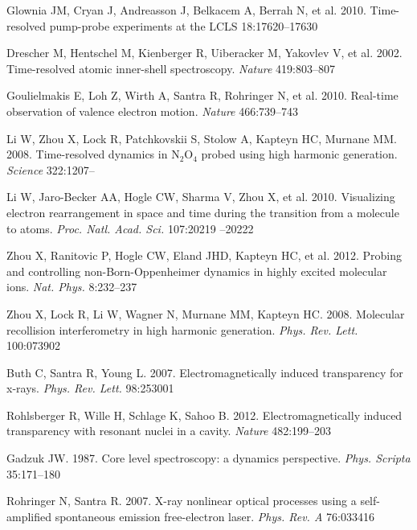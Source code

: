 \documentclass{ar-1col}
\begin{document}
\begin{thebibliography}{000}
Glownia JM, Cryan J, Andreasson J, Belkacem A, Berrah N, et al. 2010.
  Time-resolved pump-probe experiments at the {LCLS} 18:17620--17630

Drescher M, Hentschel M, Kienberger R, Uiberacker M, Yakovlev V, et al. 2002. {Time-resolved}
  atomic {inner-shell} spectroscopy. \textit{Nature} 419:803--807

Goulielmakis E, Loh Z, Wirth A, Santra R, Rohringer N, et al. 2010. {Real-time}
  observation of valence electron motion. \textit{Nature} 466:739--743

Li W, Zhou X, Lock R, Patchkovskii S, Stolow A, Kapteyn HC, Murnane MM. 2008.
  Time-resolved dynamics in $\textrm{N}_2\textrm{O}_4$ probed using high
  harmonic generation. \textit{Science} 322:1207--

Li W, {Jaro-Becker} AA, Hogle CW, Sharma V, Zhou X, et al. 2010. Visualizing electron rearrangement in space and time during
  the transition from a molecule to atoms. \textit{Proc. Natl. Acad. Sci.}
  107:20219 --20222

Zhou X, Ranitovic P, Hogle CW, Eland JHD, Kapteyn HC, et al. 2012. Probing
  and controlling {non-Born-Oppenheimer} dynamics in highly excited molecular
  ions. \textit{Nat. Phys.} 8:232--237

Zhou X, Lock R, Li W, Wagner N, Murnane MM, Kapteyn HC. 2008. Molecular
  recollision interferometry in high harmonic generation. \textit{Phys. Rev.
  Lett.} 100:073902

Buth C, Santra R, Young L. 2007. Electromagnetically induced transparency for
  x-rays. \textit{Phys. Rev. Lett.} 98:253001

Rohlsberger R, Wille H, Schlage K, Sahoo B. 2012. Electromagnetically induced
  transparency with resonant nuclei in a cavity. \textit{Nature} 482:199--203

Gadzuk JW. 1987. Core level spectroscopy: a dynamics perspective. \textit{Phys.
  Scripta} 35:171--180

Rohringer N, Santra R. 2007. X-ray nonlinear optical processes using a
  self-amplified spontaneous emission free-electron laser. \textit{Phys. Rev.
  A} 76:033416


\end{thebibliography}
\end{document}
